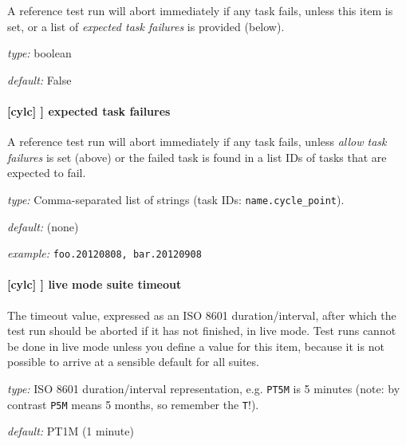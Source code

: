 A reference test run will abort immediately if any task fails, unless
this item is set, or a list of {\em expected task failures} is provided
(below).

\begin{myitemize}
    \item {\em type:} boolean
    \item {\em default:} False
\end{myitemize}

\paragraph[expected task failures]{[cylc] \textrightarrow [[reference test]] \textrightarrow expected task failures}

A reference test run will abort immediately if any task fails, unless
{\em allow task failures} is set (above) or the failed task is found
in a list IDs of tasks that are expected to fail.

\begin{myitemize}
    \item {\em type:} Comma-separated list of strings (task IDs: \lstinline=name.cycle_point=).
    \item {\em default:} (none)
    \item {\em example:} \lstinline=foo.20120808, bar.20120908=
\end{myitemize}

\paragraph[live mode suite timeout]{[cylc] \textrightarrow [[reference test]] \textrightarrow live mode suite timeout}

The timeout value, expressed as an ISO 8601 duration/interval, after which the
test run should be aborted if it has not finished, in live mode. Test runs
cannot be done in live mode unless you define a value for this item, because
it is not possible to arrive at a sensible default for all suites.

\begin{myitemize}
    \item {\em type:} ISO 8601 duration/interval representation, e.g.
        \lstinline=PT5M= is 5 minutes (note: by contrast \lstinline=P5M= means 5
         months, so remember the \lstinline=T=!).
    \item {\em default:} PT1M (1 minute)
\end{myitemize}

